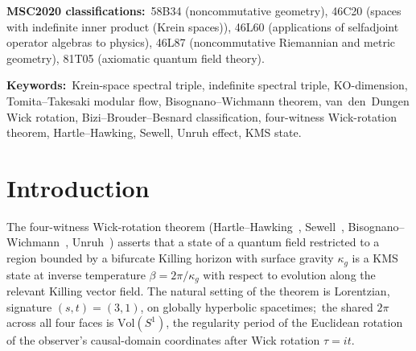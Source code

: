 \documentclass[11pt,a4paper]{article}
\theoremstyle{plain}
\theoremstyle{definition}
\newcommand{\Vol}{\mathrm{Vol}}
\newcommand{\DGV}{D_{\mathrm{GV}}}
\begin{document}
\begin{abstract}
recorded:\ the Bizi--Brouder--Besnard universal anticommutation
$\{\chi, D\} = 0$ does not hold on the truthful Camporesi--Higuchi
Dirac (chirality-as-$\gamma^5$ identification + chirality-diagonal
$\DGV$ + BBB universal axiom is a mutually inconsistent triple), and
the master Mellin engine M3 sub-mechanism is sectional in
$n_\text{fock}$-parity rather than spacetime signature. The closure is
at finite cutoff;\ a Lorentzian-propinquity quantitative-rate analog
(no published construction as of May~2026) is the named multi-month
follow-up. The present paper does not supersede Paper~42:\ Paper~42 is
the Riemannian closure;\ Paper~43 is the Lorentzian extension. Together
they constitute the four-witness Wick-rotation arc at the
operator-system level.
\end{abstract}

\bigskip\noindent
\textbf{MSC2020 classifications:}\ 58B34 (noncommutative geometry),
46C20 (spaces with indefinite inner product (Krein spaces)),
46L60 (applications of selfadjoint operator algebras to physics),
46L87 (noncommutative Riemannian and metric geometry),
81T05 (axiomatic quantum field theory).

\medskip\noindent
\textbf{Keywords:}\ Krein-space spectral triple, indefinite spectral
triple, KO-dimension, Tomita--Takesaki modular flow,
Bisognano--Wichmann theorem, van~den~Dungen Wick rotation,
Bizi--Brouder--Besnard classification,
four-witness Wick-rotation theorem, Hartle--Hawking, Sewell,
Unruh effect, KMS state.

\section{Introduction}\label{sec:intro}

The four-witness Wick-rotation theorem
(Hartle--Hawking~\cite{hartle_hawking1976}, Sewell~\cite{sewell1982},
Bisognano--Wichmann~\cite{bisognano_wichmann1976},
Unruh~\cite{unruh1976}) asserts that a state of a quantum field
restricted to a region bounded by a bifurcate Killing horizon with
surface gravity $\kappa_g$ is a KMS state at inverse temperature
$\beta = 2\pi / \kappa_g$ with respect to evolution along the
relevant Killing vector field. The natural setting of the theorem is
Lorentzian, signature $(s, t) = (3, 1)$, on globally hyperbolic
spacetimes;\ the shared $2\pi$ across all four faces is $\Vol(S^1)$,
the regularity period of the Euclidean rotation of the observer's
causal-domain coordinates after Wick rotation $\tau = i t$.
\end{document}

